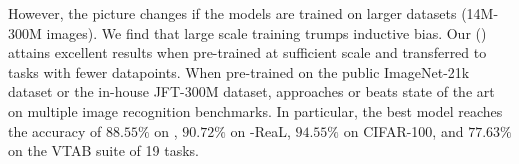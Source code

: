 However, the picture changes if the models are trained on larger datasets (14M-300M images). 
We find that large scale training trumps inductive bias.
Our \oursfull{} (\oursabbrv{}) attains excellent results when pre-trained at sufficient scale and transferred to tasks with fewer datapoints.
When pre-trained on the public ImageNet-21k dataset or the in-house JFT-300M dataset, \oursabbrv{} approaches or beats state of the art on multiple image recognition benchmarks.
In particular, the best model reaches the accuracy of $88.55\%$ on \imagenet, $90.72\%$ on \imagenet-ReaL, $94.55\%$ on CIFAR-100, and $77.63\%$ on the VTAB suite of 19 tasks.
















